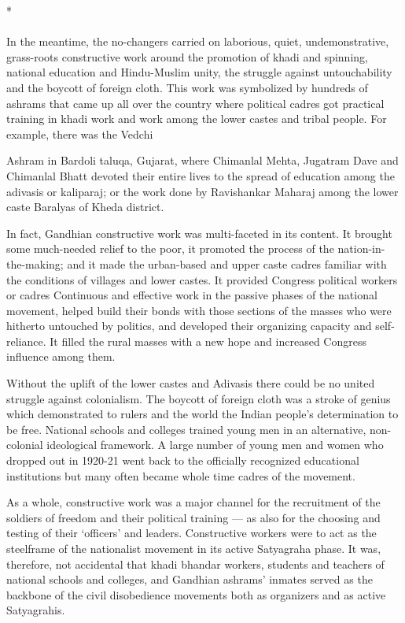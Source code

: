 \begin{center}*\end{center}

\paragraph*{}


In the meantime, the no-changers carried on laborious, quiet, undemonstrative, grass-roots constructive work around the promotion of khadi and spinning, national education and Hindu-Muslim unity, the struggle against untouchability and the boycott of foreign cloth. This work was symbolized by hundreds of ashrams that came up all over the country where political cadres got practical training in khadi work and work among the lower castes and tribal people. For example, there was the Vedchi

Ashram in Bardoli taluqa, Gujarat, where Chimanlal Mehta, Jugatram Dave and Chimanlal Bhatt devoted their entire lives to the spread of education among the adivasis or kaliparaj; or the work done by Ravishankar Maharaj among the lower caste Baralyas of Kheda district.

In fact, Gandhian constructive work was multi-faceted in its content. It brought some much-needed relief to the poor, it promoted the process of the nation-in-the-making; and it made the urban-based and upper caste cadres familiar with the conditions of villages and lower castes. It provided Congress political workers or cadres Continuous and effective work in the passive phases of the national movement, helped build their bonds with those sections of the masses who were hitherto untouched by politics, and developed their organizing capacity and self-reliance. It filled the rural masses with a new hope and increased Congress influence among them.

Without the uplift of the lower castes and Adivasis there could be no united struggle against colonialism. The boycott of foreign cloth was a stroke of genius which demonstrated to rulers and the world the Indian people's determination to be free. National schools and colleges trained young men in an alternative, non-colonial ideological framework. A large number of young men and women who dropped out in 1920-21 went back to the officially recognized educational institutions but many often became whole time cadres of the movement.

As a whole, constructive work was a major channel for the recruitment of the soldiers of freedom and their political training — as also for the choosing and testing of their `officers' and leaders. Constructive workers were to act as the steelframe of the nationalist movement in its active Satyagraha phase. It was, therefore, not accidental that khadi bhandar workers, students and teachers of national schools and colleges, and Gandhian ashrams' inmates served as the backbone of the civil disobedience movements both as organizers and as active Satyagrahis.

